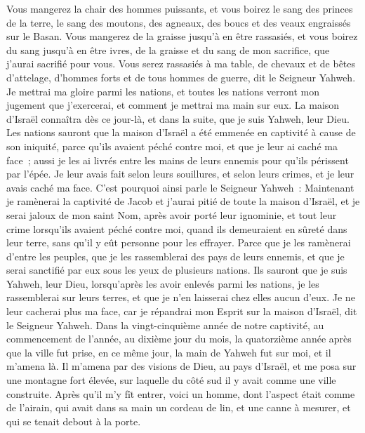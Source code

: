 \begin{multicols}{2}
Vous mangerez la chair des hommes puissants, et vous boirez le sang des princes de la terre, le sang des moutons, des agneaux, des boucs et des veaux engraissés sur le Basan.
Vous mangerez de la graisse jusqu'à en être rassasiés, et vous boirez du sang jusqu'à en être ivres, de la graisse et du sang de mon sacrifice, que j'aurai sacrifié pour vous.
Vous serez rassasiés à ma table, de chevaux et de bêtes d'attelage, d'hommes forts et de tous hommes de guerre, dit le Seigneur Yahweh.
Je mettrai ma gloire parmi les nations, et toutes les nations verront mon jugement que j'exercerai, et comment je mettrai ma main sur eux.
La maison d'Israël connaîtra dès ce jour-là, et dans la suite, que je suis Yahweh, leur Dieu.
Les nations sauront que la maison d'Israël a été emmenée en captivité à cause de son iniquité, parce qu'ils avaient péché contre moi, et que je leur ai caché ma face~; aussi je les ai livrés entre les mains de leurs ennemis pour qu'ils périssent par l'épée.
Je leur avais fait selon leurs souillures, et selon leurs crimes, et je leur avais caché ma face.
C'est pourquoi ainsi parle le Seigneur Yahweh~: Maintenant je ramènerai la captivité de Jacob et j'aurai pitié de toute la maison d'Israël, et je serai jaloux de mon saint Nom,
après avoir porté leur ignominie, et tout leur crime lorsqu'ils avaient péché contre moi, quand ils demeuraient en sûreté dans leur terre, sans qu'il y eût personne pour les effrayer.
Parce que je les ramènerai d'entre les peuples, que je les rassemblerai des pays de leurs ennemis, et que je serai sanctifié par eux sous les yeux de plusieurs nations.
Ils sauront que je suis Yahweh, leur Dieu, lorsqu'après les avoir enlevés parmi les nations, je les rassemblerai sur leurs terres, et que je n'en laisserai chez elles aucun d'eux.
Je ne leur cacherai plus ma face, car je répandrai mon Esprit sur la maison d'Israël, dit le Seigneur Yahweh.
\VerseOne{}Dans la vingt-cinquième année de notre captivité, au commencement de l'année, au dixième jour du mois, la quatorzième année après que la ville fut prise, en ce même jour, la main de Yahweh fut sur moi, et il m'amena là.
Il m'amena par des visions de Dieu, au pays d'Israël, et me posa sur une montagne fort élevée, sur laquelle du côté sud il y avait comme une ville construite.
Après qu'il m'y fît entrer, voici un homme, dont l'aspect était comme de l'airain, qui avait dans sa main un cordeau de lin, et une canne à mesurer, et qui se tenait debout à la porte.

\end{multicols}
